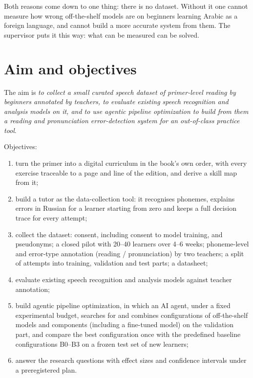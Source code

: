 Both reasons come down to one thing: there is no dataset. Without it one cannot measure how wrong off-the-shelf
models are on beginners learning Arabic as a foreign language, and cannot build a more accurate system from them. The supervisor puts it
this way: what can be measured can be solved.

\section{Aim and objectives}

The aim is \emph{to collect a small curated speech dataset of primer-level reading by beginners annotated by
teachers, to evaluate existing speech recognition and analysis models on it, and to use agentic pipeline optimization
to build from them a reading and pronunciation error-detection system for an out-of-class practice tool}.

Objectives:
\begin{enumerate}[label=O\arabic*.]
  \item turn the primer into a digital curriculum in the book's own order, with every exercise traceable to a
    page and line of the edition, and derive a skill map from it;
  \item build a tutor as the data-collection tool: it recognises phonemes, explains errors in Russian for a
    learner starting from zero and keeps a full decision trace for every attempt;
  \item collect the dataset: consent, including consent to model training, and pseudonyms; a closed pilot with
    20--40 learners over 4--6 weeks; phoneme-level and error-type annotation (reading / pronunciation) by two teachers; a split of attempts into training, validation and test parts; a datasheet;
  \item evaluate existing speech recognition and analysis models against teacher annotation;
  \item build agentic pipeline optimization, in which an AI agent, under a fixed experimental budget, searches for and
    combines configurations of off-the-shelf models and components (including a fine-tuned model) on the
    validation part, and compare the best configuration once with the predefined baseline configurations B0--B3
    on a frozen test set of new learners;
  \item answer the research questions with effect sizes and confidence intervals under a preregistered plan.
\end{enumerate}

